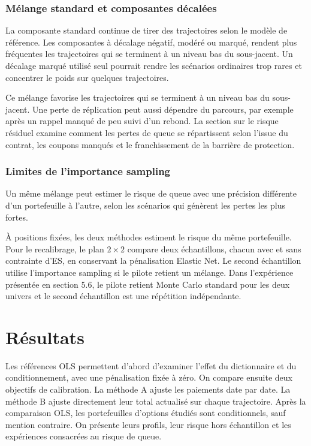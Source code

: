 \documentclass[12pt,a4paper]{article}
\newcommand{\1}{\mathbf{1}}
\begin{document}
\subsubsection*{Mélange standard et composantes décalées}

La composante standard continue de tirer des trajectoires selon le modèle de référence. Les composantes à décalage négatif, modéré ou marqué, rendent plus fréquentes les trajectoires qui se terminent à un niveau bas du sous-jacent. Un décalage marqué utilisé seul pourrait rendre les scénarios ordinaires trop rares et concentrer le poids sur quelques trajectoires.

Ce mélange favorise les trajectoires qui se terminent à un niveau bas du sous-jacent. Une perte de réplication peut aussi dépendre du parcours, par exemple après un rappel manqué de peu suivi d'un rebond. La section sur le risque résiduel examine comment les pertes de queue se répartissent selon l’issue du contrat, les coupons manqués et le franchissement de la barrière de protection.

\subsubsection*{Limites de l'importance sampling}

Un même mélange peut estimer le risque de queue avec une précision différente d'un portefeuille à l'autre, selon les scénarios qui génèrent les pertes les plus fortes.

{À positions fixées, les deux méthodes estiment le risque du même portefeuille. Pour le recalibrage, le plan $2\times 2$ compare deux échantillons, chacun avec et sans contrainte d’ES, en conservant la pénalisation Elastic Net. Le second échantillon utilise l’importance sampling si le pilote retient un mélange. Dans l’expérience présentée en section 5.6, le pilote retient Monte Carlo standard pour les deux univers et le second échantillon est une répétition indépendante.}

\section{Résultats}

Les références OLS permettent d'abord d'examiner l'effet du dictionnaire et du conditionnement, avec une pénalisation fixée à zéro. On compare ensuite deux objectifs de calibration. La méthode A ajuste les paiements date par date. La méthode B ajuste directement leur total actualisé sur chaque trajectoire. Après la comparaison OLS, les portefeuilles d'options étudiés sont conditionnels, sauf mention contraire. On présente leurs profils, leur risque hors échantillon et les expériences consacrées au risque de queue.
\end{document}
